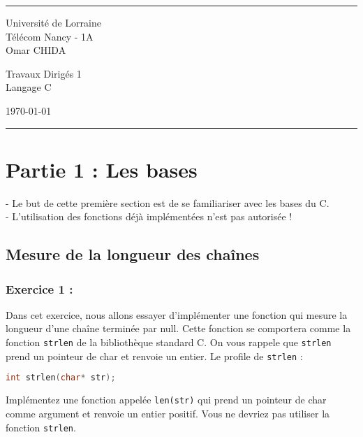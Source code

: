 \documentclass[a4paper]{article}
\begin{document}
	
	
	\fancyhead[C]{}
	\hrule \medskip %
	\begin{minipage}{0.295\textwidth} 
		\raggedright
		\footnotesize
		Université de Lorraine\hfill\\   
		Télécom Nancy - 1A\hfill\\
		Omar CHIDA
	\end{minipage}
	\begin{minipage}{0.4\textwidth} 
		\centering 
		\large 
		Travaux Dirigés 1\\ 
		\normalsize 
		Langage C\\ 
	\end{minipage}
	\begin{minipage}{0.295\textwidth} 
		\raggedleft
		\today\hfill\\
	\end{minipage}
	\medskip\hrule 
	\bigskip
	
	
	\section*{Partie 1 : Les bases}
	- Le but de cette première section est de se familiariser avec les bases du C.\\
	- L'utilisation des fonctions déjà implémentées n'est pas autorisée !
	
	\subsection*{Mesure de la longueur des chaînes}
	\subsubsection*{Exercice 1 :}
	Dans cet exercice, nous allons essayer d'implémenter une fonction qui mesure la longueur d'une chaîne terminée par null. Cette fonction se comportera comme la fonction \texttt{strlen} de la bibliothèque standard C. On vous rappele que \texttt{strlen} prend un pointeur de char et renvoie un entier.
	Le profile de \texttt{strlen} :
	\begin{lstlisting}[language=C]
int strlen(char* str);
	\end{lstlisting}
	Implémentez une fonction appelée \texttt{len(str)} qui prend un pointeur de char comme argument et renvoie un entier positif. Vous ne devriez pas utiliser la fonction \texttt{strlen}.
	
\end{document}
